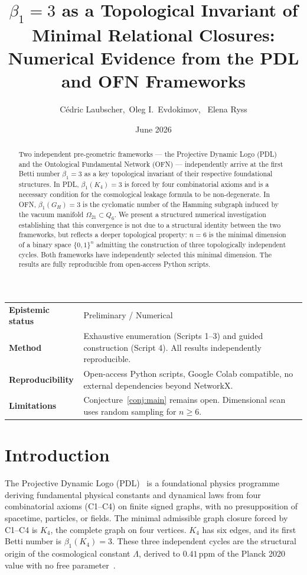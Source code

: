 \documentclass[11pt,a4paper]{article}
\title{$\beta_1 = 3$ as a Topological Invariant of Minimal Relational Closures:\\
Numerical Evidence from the PDL and OFN Frameworks}
\author{
  C\'edric Laubscher,\ Oleg I.\ Evdokimov, \ Elena Ryss
}
\date{June 2026}
\newcommand{\epistemic}[4]{%
\begin{center}
\small
\begin{tabular}{>{\bfseries}p{3cm} p{10cm}}
\toprule
Epistemic status & #1 \\
Method           & #2 \\
Reproducibility  & #3 \\
Limitations      & #4 \\
\bottomrule
\end{tabular}
\end{center}
}
\begin{document}
\maketitle

\begin{abstract}
Two independent pre-geometric frameworks --- the Projective Dynamic Logo (PDL) and the Ontological Fundamental Network (OFN) --- independently arrive at the first Betti number $\beta_1 = 3$ as a key topological invariant of their respective foundational structures. In PDL, $\beta_1(K_4) = 3$ is forced by four combinatorial axioms and is a necessary condition for the cosmological leakage formula to be non-degenerate. In OFN, $\beta_1(G_H) = 3$ is the cyclomatic number of the Hamming subgraph induced by the vacuum manifold $\Omega_{21} \subset Q_6$. We present a structured numerical investigation establishing that this convergence is not due to a structural identity between the two frameworks, but reflects a deeper topological property: $n = 6$ is the minimal dimension of a binary space $\{0,1\}^n$ admitting the construction of three topologically independent cycles. Both frameworks have independently selected this minimal dimension. The results are fully reproducible from open-access Python scripts.
\end{abstract}

\epistemic{Preliminary / Numerical}{Exhaustive enumeration (Scripts 1--3) and guided construction (Script 4). All results independently reproducible.}{Open-access Python scripts, Google Colab compatible, no external dependencies beyond NetworkX.}{Conjecture~\ref{conj:main} remains open. Dimensional scan uses random sampling for $n \geq 6$.}

\clearpage
\tableofcontents
\clearpage

\section{Introduction}

The Projective Dynamic Logo (PDL)~\cite{Laubscher_DM_2026} is a foundational physics programme deriving fundamental physical constants and dynamical laws from four combinatorial axioms (C1--C4) on finite signed graphs, with no presupposition of spacetime, particles, or fields. The minimal admissible graph closure forced by C1--C4 is $K_4$, the complete graph on four vertices. $K_4$ has six edges, and its first Betti number is $\beta_1(K_4) = 3$. These three independent cycles are the structural origin of the cosmological constant $\Lambda$, derived to $0.41\,\mathrm{ppm}$ of the Planck 2020 value with no free parameter~\cite{Laubscher_D53_2026}.
\end{document}
